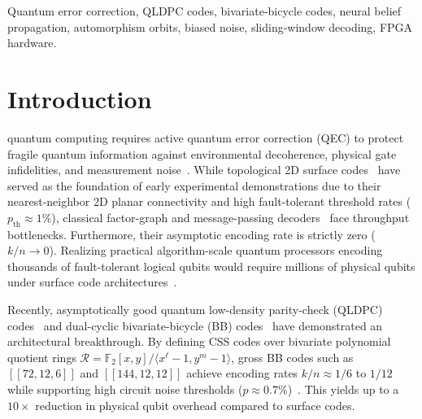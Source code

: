 \documentclass[journal]{IEEEtran}
\begin{document}
\begin{IEEEkeywords}
Quantum error correction, QLDPC codes, bivariate-bicycle codes, neural belief propagation, automorphism orbits, biased noise, sliding-window decoding, FPGA hardware.
\end{IEEEkeywords}

\section{Introduction}
 quantum computing requires active quantum error correction (QEC) to protect fragile quantum information against environmental decoherence, physical gate infidelities, and measurement noise~\cite{dennis2002topological,fowler2012surface}. While topological 2D surface codes~\cite{dennis2002topological,fowler2012surface,delfosse2021almost,litinski2019game} have served as the foundation of early experimental demonstrations due to their nearest-neighbor 2D planar connectivity and high fault-tolerant threshold rates ($p_{\text{th}} \approx 1\%$), classical factor-graph and message-passing decoders~\cite{richardson2001capacity,mackay1996near,kschischang2001factor} face throughput bottlenecks. Furthermore, their asymptotic encoding rate is strictly zero ($k/n \to 0$). Realizing practical algorithm-scale quantum processors encoding thousands of fault-tolerant logical qubits would require millions of physical qubits under surface code architectures~\cite{bravyi2024high}.

Recently, asymptotically good quantum low-density parity-check (QLDPC) codes~\cite{panteleev2021degenerate} and dual-cyclic bivariate-bicycle (BB) codes~\cite{bravyi2024high,bravyi2024circuits,rabeti2025list,basak2026hierarchical} have demonstrated an architectural breakthrough. By defining CSS codes over bivariate polynomial quotient rings $\mathcal{R} = \mathbb{F}_2[x, y] / \langle x^\ell - 1, y^m - 1 \rangle$, gross BB codes such as $[[72, 12, 6]]$ and $[[144, 12, 12]]$ achieve encoding rates $k/n \approx 1/6$ to $1/12$ while supporting high circuit noise thresholds ($p \approx 0.7\%$)~\cite{bravyi2024high}. This yields up to a $10\times$ reduction in physical qubit overhead compared to surface codes.
\end{document}
